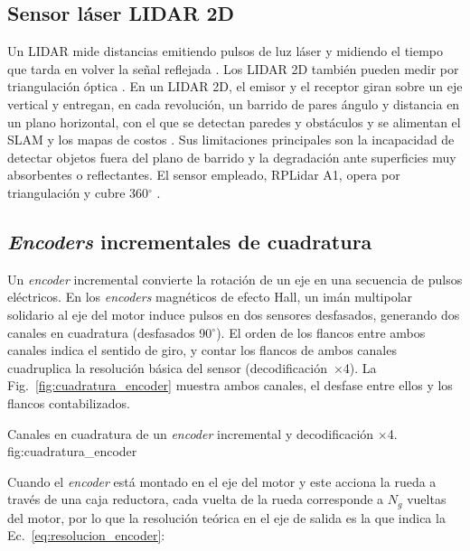 \subsection{Sensor láser LIDAR 2D}
\label{sec:lidar_marco}

Un \gls{LIDAR} mide distancias emitiendo pulsos de luz láser y midiendo el tiempo que tarda en volver la señal reflejada \citep[Sec.~6.8]{corke2023}. Los \gls{LIDAR} 2D también pueden medir por triangulación óptica \citep{ran2025review2dlidar}. En un \gls{LIDAR} 2D, el emisor y el receptor giran sobre un eje vertical y entregan, en cada revolución, un barrido de pares ángulo y distancia en un plano horizontal, con el que se detectan paredes y obstáculos y se alimentan el SLAM y los mapas de costos \citep{corke2023}. Sus limitaciones principales son la incapacidad de detectar objetos fuera del plano de barrido y la degradación ante superficies muy absorbentes o reflectantes. El sensor empleado, RPLidar A1, opera por triangulación y cubre 360$^\circ$ \citep{SlamtecA1Datasheet}.

\subsection{\texorpdfstring{\textit{Encoders}}{Encoders} incrementales de cuadratura}
\label{sec:encoders_marco}

Un \textit{encoder} incremental convierte la rotación de un eje en una secuencia de
pulsos eléctricos. En los \textit{encoders} magnéticos de efecto Hall, un imán
multipolar solidario al eje del motor induce pulsos en dos sensores
desfasados, generando dos canales en cuadratura (desfasados 90$^\circ$). El
orden de los flancos entre ambos canales indica el sentido de giro, y contar
los flancos de ambos canales cuadruplica la resolución básica del sensor
(decodificación~$\times$4). La Fig.~\ref{fig:cuadratura_encoder} muestra ambos
canales, el desfase entre ellos y los flancos contabilizados.

{Canales en cuadratura de un \textit{encoder} incremental y decodificación $\times$4.}
{fig:cuadratura_encoder}

Cuando el \textit{encoder} está montado en el eje del
motor y este acciona la rueda a través de una caja reductora, cada vuelta de
la rueda corresponde a $N_g$ vueltas del motor, por lo que la resolución
teórica en el eje de salida es la que indica la Ec.~\eqref{eq:resolucion_encoder}:

